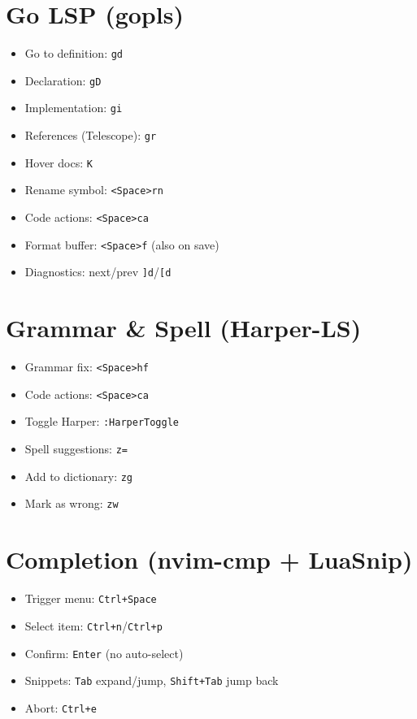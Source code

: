 \documentclass[9pt,twocolumn]{extarticle}
\newcommand{\key}[1]{\mbox{\texttt{#1}}}
\newcommand{\leader}{\key{<Space>}} %
\begin{document}
\section{Go LSP (gopls)}
\begin{itemize}
  \item Go to definition: \key{gd}
  \item Declaration: \key{gD}
  \item Implementation: \key{gi}
  \item References (Telescope): \key{gr}
  \item Hover docs: \key{K}
  \item Rename symbol: \leader\key{rn}
  \item Code actions: \leader\key{ca}
  \item Format buffer: \leader\key{f} (also on save)
  \item Diagnostics: next/prev \key{]d}/\key{[d}
\end{itemize}

\section{Grammar \& Spell (Harper-LS)}
\begin{itemize}
  \item Grammar fix: \leader\key{hf}
  \item Code actions: \leader\key{ca}
  \item Toggle Harper: \key{:HarperToggle}
  \item Spell suggestions: \key{z=}
  \item Add to dictionary: \key{zg}
  \item Mark as wrong: \key{zw}
\end{itemize}

\section{Completion (nvim-cmp + LuaSnip)}
\begin{itemize}
  \item Trigger menu: \key{Ctrl+Space}
  \item Select item: \key{Ctrl+n}/\key{Ctrl+p}
  \item Confirm: \key{Enter} (no auto-select)
  \item Snippets: \key{Tab} expand/jump, \key{Shift+Tab} jump back
  \item Abort: \key{Ctrl+e}
\end{itemize}
\end{document}
